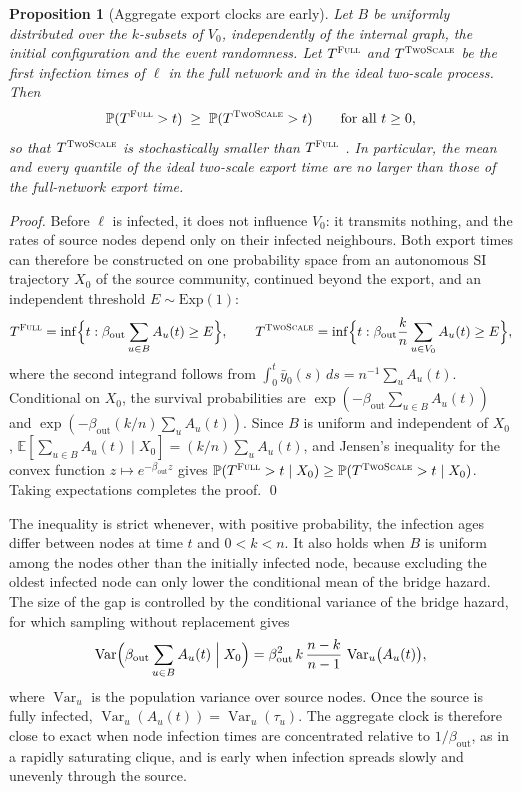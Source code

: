 \documentclass[a4paper,fleqn]{cas-sc}
\newtheorem{proposition}{Proposition}
\newcommand{\ibar}{\bar{y}}
\newcommand{\Exp}{\mathrm{Exp}}
\newcommand{\Full}{\textup{\textsc{Full}}}
\newcommand{\TS}{\textup{\textsc{TwoScale}}}
\begin{document}
\begin{proposition}[Aggregate export clocks are early]
\label{prop:ordering}
Let $B$ be uniformly distributed over the $k$-subsets of $V_0$, independently of the internal graph, the initial configuration and the event randomness. Let $T^{\Full}$ and $T^{\TS}$ be the first infection times of $\ell$ in the full network and in the ideal two-scale process. Then
\[
\mathbb{P}(T^{\Full}>t)\;\ge\;\mathbb{P}(T^{\TS}>t)\qquad\text{for all }t\ge0,
\]
so that $T^{\TS}$ is stochastically smaller than $T^{\Full}$ \citep{shaked2007}. In particular, the mean and every quantile of the ideal two-scale export time are no larger than those of the full-network export time.
\end{proposition}

\begin{proof}
Before $\ell$ is infected, it does not influence $V_0$: it transmits nothing, and the rates of source nodes depend only on their infected neighbours. Both export times can therefore be constructed on one probability space from an autonomous SI trajectory $X_0$ of the source community, continued beyond the export, and an independent threshold $E\sim\Exp(1)$:
\[
T^{\Full}=\inf\Bigl\{t:\beta_{\mathrm{out}}\sum_{u\in B}A_u(t)\ge E\Bigr\},\qquad
T^{\TS}=\inf\Bigl\{t:\beta_{\mathrm{out}}\frac{k}{n}\sum_{u\in V_0}A_u(t)\ge E\Bigr\},
\]
where the second integrand follows from $\int_0^t\ibar_0(s)\,ds=n^{-1}\sum_uA_u(t)$. Conditional on $X_0$, the survival probabilities are $\exp(-\beta_{\mathrm{out}}\sum_{u\in B}A_u(t))$ and $\exp(-\beta_{\mathrm{out}}(k/n)\sum_uA_u(t))$. Since $B$ is uniform and independent of $X_0$, $\mathbb{E}[\sum_{u\in B}A_u(t)\mid X_0]=(k/n)\sum_uA_u(t)$, and Jensen's inequality for the convex function $z\mapsto e^{-\beta_{\mathrm{out}}z}$ gives $\mathbb{P}(T^{\Full}>t\mid X_0)\ge\mathbb{P}(T^{\TS}>t\mid X_0)$. Taking expectations completes the proof. \qed
\end{proof}

The inequality is strict whenever, with positive probability, the infection ages differ between nodes at time $t$ and $0<k<n$. It also holds when $B$ is uniform among the nodes other than the initially infected node, because excluding the oldest infected node can only lower the conditional mean of the bridge hazard. The size of the gap is controlled by the conditional variance of the bridge hazard, for which sampling without replacement gives
\begin{equation}
\label{eq:hazard_variance}
\operatorname{Var}\Bigl(\beta_{\mathrm{out}}\sum_{u\in B}A_u(t)\Bigm| X_0\Bigr)=\beta_{\mathrm{out}}^2\,k\,\frac{n-k}{n-1}\,\operatorname{Var}_u\bigl(A_u(t)\bigr),
\end{equation}
where $\operatorname{Var}_u$ is the population variance over source nodes. Once the source is fully infected, $\operatorname{Var}_u(A_u(t))=\operatorname{Var}_u(\tau_u)$. The aggregate clock is therefore close to exact when node infection times are concentrated relative to $1/\beta_{\mathrm{out}}$, as in a rapidly saturating clique, and is early when infection spreads slowly and unevenly through the source.
\end{document}
